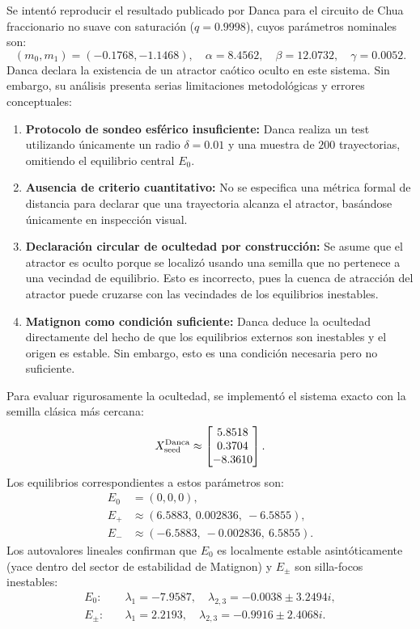 \documentclass[journal]{IEEEtran}
\begin{document}
Se intentó reproducir el resultado publicado por Danca \cite{Danca2017} para el circuito de Chua fraccionario no suave con saturación ($q=0.9998$), cuyos parámetros nominales son:
\[
(m_0,m_1)=(-0.1768,-1.1468), \quad \alpha=8.4562, \quad \beta=12.0732, \quad \gamma=0.0052.
\]
Danca \cite{Danca2017} declara la existencia de un atractor caótico oculto en este sistema. Sin embargo, su análisis presenta serias limitaciones metodológicas y errores conceptuales:
\begin{enumerate}
    \item \textbf{Protocolo de sondeo esférico insuficiente:} Danca realiza un test utilizando únicamente un radio $\delta = 0.01$ y una muestra de $200$ trayectorias, omitiendo el equilibrio central $E_0$.
    \item \textbf{Ausencia de criterio cuantitativo:} No se especifica una métrica formal de distancia para declarar que una trayectoria alcanza el atractor, basándose únicamente en inspección visual.
    \item \textbf{Declaración circular de ocultedad por construcción:} Se asume que el atractor es oculto porque se localizó usando una semilla que no pertenece a una vecindad de equilibrio. Esto es incorrecto, pues la cuenca de atracción del atractor puede cruzarse con las vecindades de los equilibrios inestables.
    \item \textbf{Matignon como condición suficiente:} Danca deduce la ocultedad directamente del hecho de que los equilibrios externos son inestables y el origen es estable. Sin embargo, esto es una condición necesaria pero no suficiente.
\end{enumerate}

Para evaluar rigurosamente la ocultedad, se implementó el sistema exacto con la semilla clásica más cercana:
\[
X_{\rm seed}^{\rm Danca} \approx \begin{bmatrix}5.8518 \\ 0.3704 \\ -8.3610\end{bmatrix}.
\]
Los equilibrios correspondientes a estos parámetros son:
\[
\begin{aligned}
E_0 &= (0,0,0), \\
E_+ &\approx(6.5883,\ 0.002836,\ -6.5855), \\
E_- &\approx(-6.5883,\ -0.002836,\ 6.5855).
\end{aligned}
\]
Los autovalores lineales confirman que $E_0$ es localmente estable asintóticamente (yace dentro del sector de estabilidad de Matignon) y $E_\pm$ son silla-focos inestables:
\begin{equation}
\label{eq:danca_eigs}
\begin{aligned}
E_0: &\quad \lambda_{1}=-7.9587,\quad \lambda_{2,3}=-0.0038\pm3.2494i,\\
E_\pm: &\quad \lambda_{1}=2.2193,\quad \lambda_{2,3}=-0.9916\pm2.4068i.
\end{aligned}
\end{equation}
\end{document}
